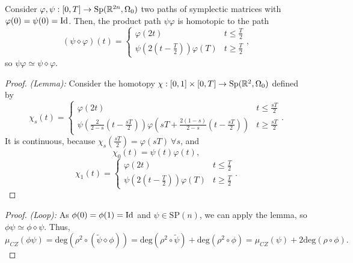 \begin{lema} \label{looplemma} Consider $\varphi, \psi : [0,T] \rightarrow \text{Sp}(\mathbb{R}^{2n},\Omega_0)$ two paths of symplectic matrices with $\varphi(0) = \psi(0) = \text{Id}$. Then, the product path $\psi\varphi$ is homotopic to the path
\[(\psi \diamond \varphi)(t) = \left\{ \begin{array}{lc} \varphi(2t) & t \leq \frac{T}2 \\ \psi\left( 2 \left( t - \frac{T}2 \right) \right) \varphi(T) & t \geq \frac{T}2 \end{array} \right. ,\]
so $\psi\varphi \simeq \psi \diamond \varphi$.
\end{lema}

\begin{proof} {\it (Lemma):} Consider the homotopy $\chi : [0,1] \times [0,T] \rightarrow \text{Sp}(\mathbb{R}^2,\Omega_0)$ defined by
\[\chi_s(t) = \left\{ \begin{array}{lc} \varphi(2t) & t \leq \frac{sT}2 \\ \psi\left( \frac2{2-s} \left( t - \frac{sT}2 \right) \right) \varphi\left( sT + \frac{2(1-s)}{2-s} \left( t - \frac{sT}2 \right) \right) & t \geq \frac{sT}2 \end{array} \right. .\]
It is continuous, because $\chi_s\left( \frac{sT}2 \right) = \varphi(sT) \ \forall s$, and
\[\chi_0(t) = \psi(t)\varphi(t) ,\]
\[\chi_1(t) = \left\{ \begin{array}{lc} \varphi(2t) & t \leq \frac{T}2 \\ \psi\left( 2 \left( t - \frac{T}2 \right) \right) \varphi(T) & t \geq \frac{T}2 \end{array} \right. .\]
\end{proof}

\begin{proof} {\it (Loop):} As $\phi(0) = \phi(1) = \text{Id}$ and $\psi \in \text{SP}(n)$, we can apply the lemma, so $\phi\psi \simeq \phi \diamond \psi$. Thus,
\[\mu_{CZ}(\phi\psi) = \text{deg}(\rho^2 \circ (\widetilde{\psi} \diamond \phi)) = \text{deg}(\rho^2 \circ \widetilde{\psi}) + \text{deg}(\rho^2 \circ \phi) = \mu_{CZ}(\psi) + 2\text{deg}(\rho \circ \phi) .\]
\end{proof}


